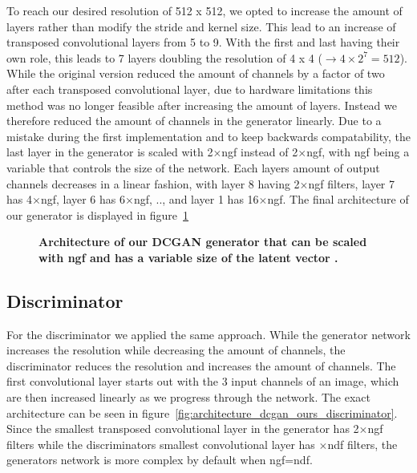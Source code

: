             To reach our desired resolution of 512 x 512, we opted to increase the amount of layers rather than modify the stride and kernel size. This lead to an increase of transposed convolutional layers from 5 to 9. With the first and last having their own role, this leads to 7 layers doubling the resolution of 4 x 4 ($\rightarrow 4 \times 2^7 = 512$). While the original version reduced the amount of channels by a factor of two after each transposed convolutional layer, due to hardware limitations this method was no longer feasible after increasing the amount of layers. Instead we therefore reduced the amount of channels in the generator linearly. Due to a mistake during the first implementation and to keep backwards compatability, the last layer in the generator is scaled with 2$\times$ngf instead of 2$\times$ngf, with ngf being a variable that controls the size of the network. Each layers amount of output channels decreases in a linear fashion, with layer 8 having 2$\times$ngf filters, layer 7 has 4$\times$ngf, layer 6 has 6$\times$ngf, .., and layer 1 has 16$\times$ngf. The final architecture of our generator is displayed in figure~\ref{fig:architecture_dcgan_ours_generator}
        
            \begin{figure}[h]
                \centering
                \caption[DCGAN generator architecture]
                {
                    \textbf{Architecture of our DCGAN generator that can be scaled with ngf and has a variable size of the latent vector .}
                }
                \label{fig:architecture_dcgan_ours_generator}
            \end{figure}

        \subsection{Discriminator}

            For the discriminator we applied the same approach. While the generator network increases the resolution while decreasing the amount of channels, the discriminator reduces the resolution and increases the amount of channels. The first convolutional layer starts out with the 3 input channels of an image, which are then increased linearly as we progress through the network. The exact architecture can be seen in figure~\ref{fig:architecture_dcgan_ours_discriminator}. Since the smallest transposed convolutional layer in the generator has 2$\times$ngf filters while the discriminators smallest convolutional layer has $\times$ndf filters, the generators network is more complex by default when ngf=ndf.


